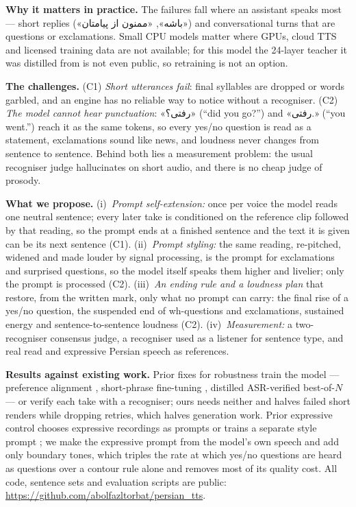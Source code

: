 \documentclass[conference]{IEEEtran}
\newcommand{\fa}[1]{{\persianfont\beginR #1\endR}}
\newcommand{\CODEURL}{\url{https://github.com/abolfazltorbat/persian_tts}}
\begin{document}
\textbf{Why it matters in practice.} The failures fall where an assistant speaks most --- short replies
(\fa{«باشه»}, \fa{«ممنون از پیامتان»}) and conversational turns that are questions or exclamations. Small
CPU models matter where GPUs, cloud TTS and licensed training data are not available; for this model the
24-layer teacher it was distilled from is not even public, so retraining is not an option.

\textbf{The challenges.} (C1) \emph{Short utterances fail}: final syllables are dropped or words garbled,
and an engine has no reliable way to notice without a recogniser. (C2) \emph{The model cannot hear
punctuation}: \fa{«رفتی؟»} (``did you go?'') and \fa{«رفتی.»} (``you went.'') reach it as the same tokens,
so every yes/no question is read as a statement, exclamations sound like news, and loudness never changes
from sentence to sentence. Behind both lies a measurement problem: the usual recogniser judge hallucinates on
short audio, and there is no cheap judge of prosody.

\textbf{What we propose.} (i)~\emph{Prompt self-extension:} once per voice the model reads one neutral
sentence; every later take is conditioned on the reference clip followed by that reading, so the prompt ends
at a finished sentence and the text it is given can be its next sentence (C1). (ii)~\emph{Prompt styling:} the same reading,
re-pitched, widened and made louder by signal processing, is the prompt for exclamations and surprised
questions, so the model itself speaks them higher and livelier; only the prompt is processed (C2).
(iii)~\emph{An ending rule and a loudness plan} that restore, from the written mark, only what no prompt can
carry: the final rise of a yes/no question, the suspended end of wh-questions and exclamations, sustained
energy and sentence-to-sentence loudness (C2). (iv)~\emph{Measurement:} a two-recogniser consensus judge,
a recogniser used as a listener for sentence type, and real read and expressive Persian speech as references.

\textbf{Results against existing work.} Prior fixes for robustness train the model --- preference alignment
\cite{koel2025}, short-phrase fine-tuning \cite{gepard2026}, distilled ASR-verified best-of-$N$
\cite{asaria2026} --- or verify each take with a recogniser; ours needs neither and halves failed short
renders while dropping retries, which halves generation work. Prior expressive control chooses expressive
recordings as prompts \cite{expprompt2026} or trains a separate style prompt \cite{indextts2026}; we make the
expressive prompt from the model's own speech and add only boundary tones, which triples the rate at which
yes/no questions are heard as questions over a contour rule alone and removes most of its quality cost. All
code, sentence sets and evaluation scripts are public: \CODEURL.
\end{document}
